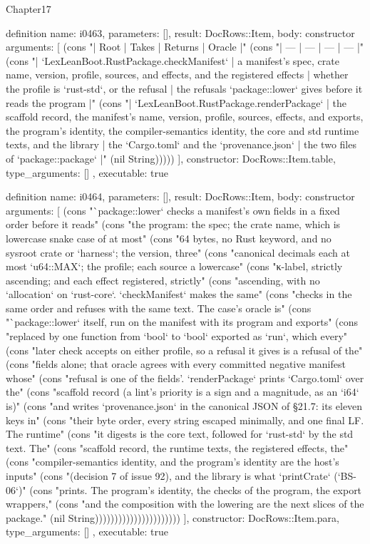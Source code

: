 \begin{lexlean}{Chapter17}
\begin{semanticmodule}
definition{
  name: i0463,
  parameters: [],
  result: DocRows::Item,
  body: constructor{
    arguments: [
      (cons "| Root | Takes | Returns | Oracle |" (cons "| --- | --- | --- | --- |" (cons "| `LexLeanBoot.RustPackage.checkManifest` | a manifest's spec, crate name, version, profile, sources, and effects, and the registered effects | whether the profile is `rust-std`, or the refusal | the refusals `package::lower` gives before it reads the program |" (cons "| `LexLeanBoot.RustPackage.renderPackage` | the scaffold record, the manifest's name, version, profile, sources, effects, and exports, the program's identity, the compiler-semantics identity, the core and std runtime texts, and the library | the `Cargo.toml` and the `provenance.json` | the two files of `package::package` |" (nil String)))))
    ],
    constructor: DocRows::Item.table,
    type_arguments: []
  },
  executable: true
}

definition{
  name: i0464,
  parameters: [],
  result: DocRows::Item,
  body: constructor{
    arguments: [
      (cons "`package::lower` checks a manifest's own fields in a fixed order before it reads" (cons "the program: the spec; the crate name, which is lowercase snake case of at most" (cons "64 bytes, no Rust keyword, and no sysroot crate or `harness`; the version, three" (cons "canonical decimals each at most `u64::MAX`; the profile; each source a lowercase" (cons "κ-label, strictly ascending; and each effect registered, strictly" (cons "ascending, with no `allocation` on `rust-core`. `checkManifest` makes the same" (cons "checks in the same order and refuses with the same text. The case's oracle is" (cons "`package::lower` itself, run on the manifest with its program and exports" (cons "replaced by one function from `bool` to `bool` exported as `run`, which every" (cons "later check accepts on either profile, so a refusal it gives is a refusal of the" (cons "fields alone; that oracle agrees with every committed negative manifest whose" (cons "refusal is one of the fields'. `renderPackage` prints `Cargo.toml` over the" (cons "scaffold record (a lint's priority is a sign and a magnitude, as an `i64` is)" (cons "and writes `provenance.json` in the canonical JSON of §21.7: its eleven keys in" (cons "their byte order, every string escaped minimally, and one final LF. The runtime" (cons "it digests is the core text, followed for `rust-std` by the std text. The" (cons "scaffold record, the runtime texts, the registered effects, the" (cons "compiler-semantics identity, and the program's identity are the host's inputs" (cons "(decision 7 of issue 92), and the library is what `printCrate` (`BS-06`)" (cons "prints. The program's identity, the checks of the program, the export wrappers," (cons "and the composition with the lowering are the next slices of the package." (nil String))))))))))))))))))))))
    ],
    constructor: DocRows::Item.para,
    type_arguments: []
  },
  executable: true
}


\end{semanticmodule}
\end{lexlean}
